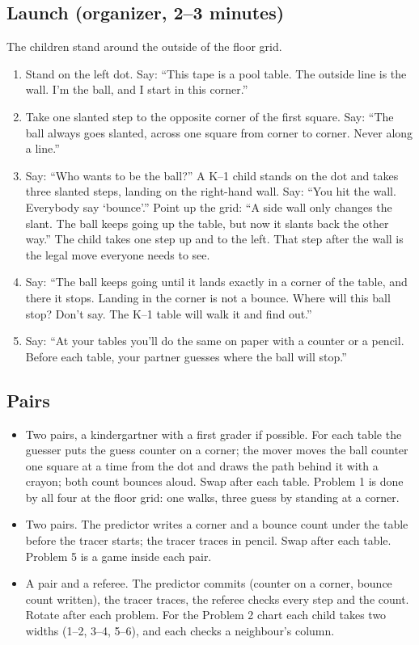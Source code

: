 \documentclass[11pt,letterpaper]{article}
\begin{document}
\subsection{Launch (organizer, 2--3 minutes)}
The children stand around the outside of the floor grid.
\begin{enumerate}
\item Stand on the left dot. Say: ``This tape is a pool table. The outside line is the wall. I'm the ball, and I start in this corner.''
\item Take one slanted step to the opposite corner of the first square. Say: ``The ball always goes slanted, across one square from corner to corner. Never along a line.''
\item Say: ``Who wants to be the ball?'' A K--1 child stands on the dot and takes three slanted steps, landing on the right-hand wall. Say: ``You hit the wall. Everybody say `bounce'.'' Point up the grid: ``A side wall only changes the slant. The ball keeps going up the table, but now it slants back the other way.'' The child takes one step up and to the left. That step after the wall is the legal move everyone needs to see.
\item Say: ``The ball keeps going until it lands exactly in a corner of the table, and there it stops. Landing in the corner is not a bounce. Where will this ball stop? Don't say. The K--1 table will walk it and find out.''
\item Say: ``At your tables you'll do the same on paper with a counter or a pencil. Before each table, your partner guesses where the ball will stop.''
\end{enumerate}

\subsection{Pairs}
\begin{itemize}[leftmargin=2.9em, labelwidth=2.5em, labelsep=0.4em, align=left, itemsep=2pt]
\item[\textbf{K--1}] Two pairs, a kindergartner with a first grader if possible. For each table the guesser puts the guess counter on a corner; the mover moves the ball counter one square at a time from the dot and draws the path behind it with a crayon; both count bounces aloud. Swap after each table. Problem 1 is done by all four at the floor grid: one walks, three guess by standing at a corner.
\item[\textbf{2--3}] Two pairs. The predictor writes a corner and a bounce count under the table before the tracer starts; the tracer traces in pencil. Swap after each table. Problem 5 is a game inside each pair.
\item[\textbf{4--5}] A pair and a referee. The predictor commits (counter on a corner, bounce count written), the tracer traces, the referee checks every step and the count. Rotate after each problem. For the Problem 2 chart each child takes two widths (1--2, 3--4, 5--6), and each checks a neighbour's column.
\end{itemize}
\end{document}
